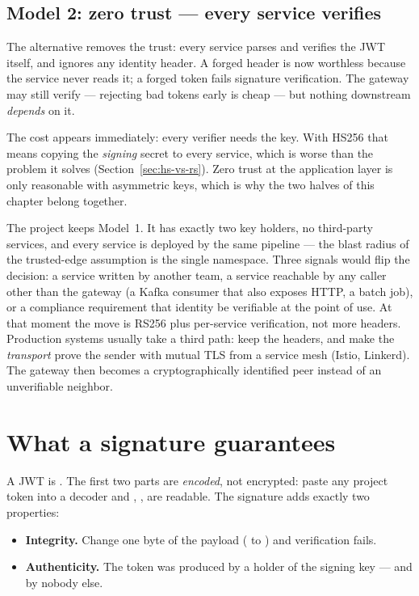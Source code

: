 \subsection{Model 2: zero trust --- every service verifies}

The alternative removes the trust: every service parses and verifies the
JWT itself, and ignores any identity header. A forged header is now
worthless because the service never reads it; a forged token fails
signature verification. The gateway may still verify --- rejecting bad
tokens early is cheap --- but nothing downstream \emph{depends} on it.

The cost appears immediately: every verifier needs the key. With HS256
that means copying the \emph{signing} secret to every service, which is
worse than the problem it solves (Section~\ref{sec:hs-vs-rs}). Zero trust
at the application layer is only reasonable with asymmetric keys, which
is why the two halves of this chapter belong together.

\begin{decision}
The project keeps Model~1. It has exactly two key holders, no
third-party services, and every service is deployed by the same
pipeline --- the blast radius of the trusted-edge assumption is the
single namespace. Three signals would flip the decision: a service
written by another team, a service reachable by any caller other than
the gateway (a Kafka consumer that also exposes HTTP, a batch job), or
a compliance requirement that identity be verifiable at the point of
use. At that moment the move is RS256 plus per-service verification,
not more headers. Production systems usually take a third path: keep the
headers, and make the \emph{transport} prove the sender with mutual TLS
from a service mesh (Istio, Linkerd). The gateway then becomes a
cryptographically identified peer instead of an unverifiable
neighbor.
\end{decision}

\section{What a signature guarantees}

A JWT is . The first
two parts are \emph{encoded}, not encrypted: paste any project token into
a decoder and , ,  are readable. The
signature adds exactly two properties:

\begin{itemize}
  \item \textbf{Integrity.} Change one byte of the payload
  ( to ) and verification fails.
  \item \textbf{Authenticity.} The token was produced by a holder of the
  signing key --- and by nobody else.
\end{itemize}

